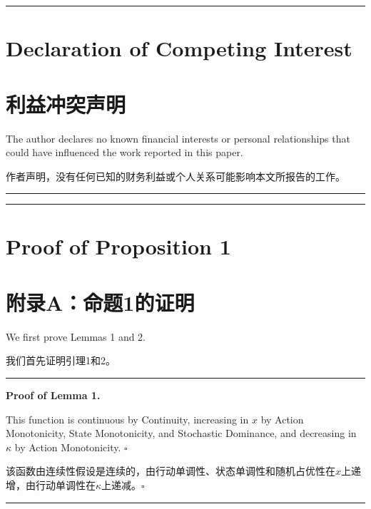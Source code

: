 \documentclass[12pt,a4paper]{article}
\newenvironment{original}
  {\par\medskip\noindent\color{black}\ignorespaces}
  {\par\medskip}
\newenvironment{translation}
  {\par\noindent\color{darkblue}\ignorespaces}
  {\par\medskip\noindent\hrule\par\medskip}
\theoremstyle{definition}
\theoremstyle{remark}
\begin{document}
\bigskip
\noindent\rule{\textwidth}{0.4pt}
\bigskip

\section*{Declaration of Competing Interest}
\section*{\color{darkblue}利益冲突声明}

\begin{original}
The author declares no known financial interests or personal relationships that could have influenced the work reported in this paper.
\end{original}
\begin{translation}
作者声明，没有任何已知的财务利益或个人关系可能影响本文所报告的工作。
\end{translation}

\bigskip
\noindent\rule{\textwidth}{0.4pt}
\bigskip

\appendix
\section{Proof of Proposition 1}
\section*{\color{darkblue}附录A：命题1的证明}

\begin{original}
We first prove Lemmas 1 and 2.
\end{original}
\begin{translation}
我们首先证明引理1和2。
\end{translation}

\medskip
\noindent\textbf{Proof of Lemma 1.}
\begin{original}
This function is continuous by Continuity, increasing in $x$ by Action Monotonicity, State Monotonicity, and Stochastic Dominance, and decreasing in $\kappa$ by Action Monotonicity. $\square$
\end{original}
\begin{translation}
该函数由连续性假设是连续的，由行动单调性、状态单调性和随机占优性在$x$上递增，由行动单调性在$\kappa$上递减。$\square$
\end{translation}
\end{document}
